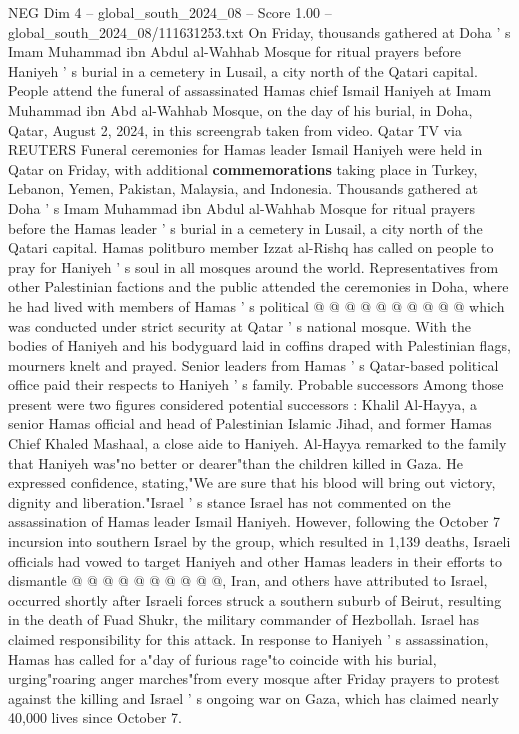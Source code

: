 \begin{textsample}{NEG Dim 4 – global\_south\_2024\_08 – Score 1.00 – global\_south\_2024\_08/111631253.txt}  \label{ex:f4_neg_339}
On Friday, thousands gathered at Doha ' s Imam Muhammad ibn Abdul al-Wahhab Mosque for ritual prayers before Haniyeh ' s burial in a cemetery in Lusail, a city north of the Qatari capital.
People attend the funeral of assassinated Hamas chief Ismail Haniyeh at Imam Muhammad ibn Abd al-Wahhab Mosque, on the day of his burial, in Doha, Qatar, August 2, 2024, in this screengrab taken from video.
Qatar TV via REUTERS Funeral ceremonies for Hamas leader Ismail Haniyeh were held in Qatar on Friday, with additional \textbf{commemorations} taking place in Turkey, Lebanon, Yemen, Pakistan, Malaysia, and Indonesia.
Thousands gathered at Doha ' s Imam Muhammad ibn Abdul al-Wahhab Mosque for ritual prayers before the Hamas leader ' s burial in a cemetery in Lusail, a city north of the Qatari capital.
Hamas politburo member Izzat al-Rishq has called on people to pray for Haniyeh ' s soul in all mosques around the world.
Representatives from other Palestinian factions and the public attended the ceremonies in Doha, where he had lived with members of Hamas ' s political @ @ @ @ @ @ @ @ @ @ which was conducted under strict security at Qatar ' s national mosque.
With the bodies of Haniyeh and his bodyguard laid in coffins draped with Palestinian flags, mourners knelt and prayed.
Senior leaders from Hamas ' s Qatar-based political office paid their respects to Haniyeh ' s family.
Probable successors Among those present were two figures considered potential successors : Khalil Al-Hayya, a senior Hamas official and head of Palestinian Islamic Jihad, and former Hamas Chief Khaled Mashaal, a close aide to Haniyeh.
Al-Hayya remarked to the family that Haniyeh was"no better or dearer"than the children killed in Gaza.
He expressed confidence, stating,"We are sure that his blood will bring out victory, dignity and liberation."Israel ' s stance Israel has not commented on the assassination of Hamas leader Ismail Haniyeh.
However, following the October 7 incursion into southern Israel by the group, which resulted in 1,139 deaths, Israeli officials had vowed to target Haniyeh and other Hamas leaders in their efforts to dismantle @ @ @ @ @ @ @ @ @ @, Iran, and others have attributed to Israel, occurred shortly after Israeli forces struck a southern suburb of Beirut, resulting in the death of Fuad Shukr, the military commander of Hezbollah.
Israel has claimed responsibility for this attack.
In response to Haniyeh ' s assassination, Hamas has called for a"day of furious rage"to coincide with his burial, urging"roaring anger marches"from every mosque after Friday prayers to protest against the killing and Israel ' s ongoing war on Gaza, which has claimed nearly 40,000 lives since October 7.

\end{textsample}
